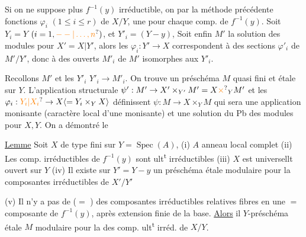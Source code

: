 
Si on ne suppose plus $f^{-1}(y)$ irréductible,  on  par la méthode précédente   fonctions  $\varphi_i$ $(1\leq i\leq r)$  de $X/Y$,  une pour chaque comp. de $f^{-1}(y)$. Soit \deleted{\unsure{$=$}} $Y_i=Y$ $(i=1,\unsure{--|\ldots,n})$, et $Y'_i={}$$(Y-y)$,  Soit  enfin $M'$ la solution des modules pour $X'=X|Y'$,
alors les  $\varphi_i:Y'\to X$ correspondent à des sections $\varphi'_i$ de $M'/Y'$, donc à des ouverts $M'_i$ de $M'$ isomorphes aux $Y'_i$.

Recollons  $M'$ et les $Y'_i$   $Y'_i\to M'_i$. On trouve un préschéma $M$  quasi fini et étale sur $Y$. L'application structurale $\psi':M'\to X'\times_{Y'}M'=X\unsure{\times}{}_YM'$ et les $\varphi_i:\unsure{Y_i|X_i}\to X\inserted{=Y_i\times_Y X}$ définissent \deleted{\unsure{$\varphi$}} $\psi:M\to X\times_Y M$ qui sera une application monisante (caractère local d'une  monisante) et  une solution du Pb des modules pour $X,Y$.
On a démontré le

\uline{Lemme} Soit $X$ de type fini sur $Y=\operatorname{Spec}(A)$, (i) $A$ anneau local complet (ii)  Les comp. irréductibles de $f^{-1}(y)$ sont ult\textsuperscript{t} irréductibles (iii) $X$ est universellt ouvert sur $Y$ (iv)  Il existe sur $Y'=Y-y$ un préschéma étale  modulaire pour la   composantes  irréductibles de $X'/Y'$

(v) Il n'y a pas de  ($=$ ) des composantes irréductibles relatives  fibres en une $=$ composante de $f^{-1}(y)$, après  extension finie de la base. \uline{Alors} il   $Y$-préschéma  étale $M$ modulaire pour la  des comp. ult\textsuperscript{t} irréd. de $X/Y$.

